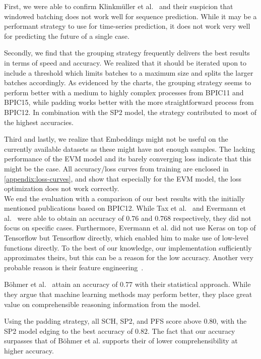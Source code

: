 First, we were able to confirm Klinkmüller et al.~\cite{klinkmuller2018reliablemonitoring} and their suspicion that windowed batching does not work well for sequence prediction. While it may be a performant strategy to use for time-series prediction, it does not work very well for predicting the future of a single case.

Secondly, we find that the grouping strategy frequently delivers the best results in terms of speed and accuracy. We realized that it should be iterated upon to include a threshold which limits batches to a maximum size and splits the larger batches accordingly. As evidenced by the charts, the grouping strategy seems to perform better with a medium to highly complex processes from BPIC11 and BPIC15, while padding works better with the more straightforward process from BPIC12. In combination with the SP2 model, the strategy contributed to most of the highest accuracies.

Third and lastly, we realize that Embeddings might not be useful on the currently available datasets as these might have not enough samples. The lacking performance of the EVM model and its barely converging loss indicate that this might be the case. All accuracy/loss curves from training are enclosed in \autoref{appendix:loss-curves}, and show that especially for the EVM model, the loss optimization does not work correctly.\\

We end the evaluation with a comparison of our best results with the initially mentioned publications based on BPIC12. While Tax et al.~\cite{tax2017} and Evermann et al.~\cite{evermann2016} were able to obtain an accuracy of $0.76$ and $0.768$ respectively, they did not focus on specific cases. Furthermore, Evermann et al. did not use Keras on top of Tensorflow but Tensorflow directly, which enabled him to make use of low-level functions directly. To the best of our knowledge, our implementation sufficiently approximates theirs, but this can be a reason for the low accuracy. Another very probable reason is their feature engineering~\cite{evermann2016}.

Böhmer et al.~\cite{boehmer2018probability} attain an accuracy of $0.77$ with their statistical approach. While they argue that machine learning methods may perform better, they place great value on comprehensible reasoning information from the model.

Using the padding strategy, all SCH, SP2, and PFS score above $0.80$, with the SP2 model edging to the best accuracy of $0.82$. The fact that our accuracy surpasses that of Böhmer et al. supports their of lower comprehensibility at higher accuracy.
